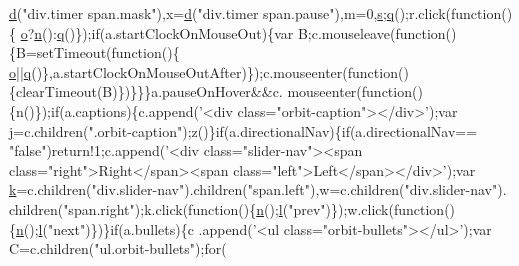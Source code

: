 \begin{DoxyCode}
      \hyperlink{jquery_8orbit-1_82_83_8min_8js_a36541169dfff685f807208881a4f0021}{d}(\textcolor{stringliteral}{"div.timer span.mask"}),x=\hyperlink{jquery_8orbit-1_82_83_8min_8js_a36541169dfff685f807208881a4f0021}{d}(\textcolor{stringliteral}{"div.timer span.pause"}),m=0,\hyperlink{validate_8js_ae059f217efaf1d50696a1214c3ce5748}{s};\hyperlink{_fixed_columns_8min_8js_a53e2359402d7f3765cf1cda82ee7c11b}{q}();r.click(\textcolor{keyword}{function}()\{
      \hyperlink{_col_reorder_8min_8js_a73cc426a4c4f73fa4748aee3ef8ef98d}{o}?\hyperlink{_table_tools_8min_8js_a9c9a7417e882d54b8c0d50ef64a3ed77}{n}():\hyperlink{_fixed_columns_8min_8js_a53e2359402d7f3765cf1cda82ee7c11b}{q}()\});\textcolor{keywordflow}{if}(a.startClockOnMouseOut)\{var B;c.mouseleave(\textcolor{keyword}{function}()\{B=setTimeout(\textcolor{keyword}{function}()\{
      \hyperlink{_col_reorder_8min_8js_a73cc426a4c4f73fa4748aee3ef8ef98d}{o}||\hyperlink{_fixed_columns_8min_8js_a53e2359402d7f3765cf1cda82ee7c11b}{q}()\},a.startClockOnMouseOutAfter)\});c.mouseenter(\textcolor{keyword}{function}()\{clearTimeout(B)\})\}\}\}a.pauseOnHover&&c.
      mouseenter(\textcolor{keyword}{function}()\{n()\});\textcolor{keywordflow}{if}(a.captions)\{c.append(\textcolor{stringliteral}{'<div class="orbit-caption"></div>'});var 
      \hyperlink{core_8constructor_8js_aab858032a95af802114b255fac6f45f2}{j}=c.children(\textcolor{stringliteral}{".orbit-caption"});z()\}\textcolor{keywordflow}{if}(a.directionalNav)\{\textcolor{keywordflow}{if}(a.directionalNav==
\textcolor{stringliteral}{"false"})\textcolor{keywordflow}{return}!1;c.append(\textcolor{stringliteral}{'<div class="slider-nav"><span class="right">Right</span><span
       class="left">Left</span></div>'});var \hyperlink{core_8constructor_8js_ab26645c014aa005ecedef329ecf58c99}{k}=c.children(\textcolor{stringliteral}{"div.slider-nav"}).children(\textcolor{stringliteral}{"span.left"}),w=c.children(\textcolor{stringliteral}{"div.slider-nav"}).
      children(\textcolor{stringliteral}{"span.right"});k.click(\textcolor{keyword}{function}()\{\hyperlink{_table_tools_8min_8js_a9c9a7417e882d54b8c0d50ef64a3ed77}{n}();\hyperlink{jquery_8data_tables_8min_8js_aae3c400cfa9afd0584b6226ac3804a40}{l}(\textcolor{stringliteral}{"prev"})\});w.click(\textcolor{keyword}{function}()\{\hyperlink{_table_tools_8min_8js_a9c9a7417e882d54b8c0d50ef64a3ed77}{n}();\hyperlink{jquery_8data_tables_8min_8js_aae3c400cfa9afd0584b6226ac3804a40}{l}(\textcolor{stringliteral}{"next"})\})\}\textcolor{keywordflow}{if}(a.bullets)\{c
      .append(\textcolor{stringliteral}{'<ul class="orbit-bullets"></ul>'});var C=c.children(\textcolor{stringliteral}{"ul.orbit-bullets"});\textcolor{keywordflow}{for}(

\end{DoxyCode}

